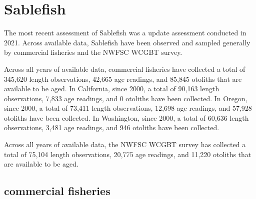 \documentclass[11pt,
  english,
  letterpaper,
]{article}
\begin{document}

\hypertarget{sablefish}{%
\section{Sablefish}\label{sablefish}}

\leavevmode\tagmcend\tagstructend


The most recent assessment of Sablefish was a update assessment conducted in 2021. Across available data, Sablefish have been observed and sampled generally by commercial fisheries and the NWFSC WCGBT survey.

\leavevmode\tagmcend\tagstructend\par


Across all years of available data, commercial fisheries have collected a total of 345,620 length observations, 42,665 age readings, and 85,845 otoliths that are available to be aged. In California, since 2000, a total of 90,163 length observations, 7,833 age readings, and 0 otoliths have been collected. In Oregon, since 2000, a total of 73,411 length observations, 12,698 age readings, and 57,928 otoliths have been collected. In Washington, since 2000, a total of 60,636 length observations, 3,481 age readings, and 946 otoliths have been collected.

\leavevmode\tagmcend\tagstructend\par


Across all years of available data, the NWFSC WCGBT survey has collected a total of 75,104 length observations, 20,775 age readings, and 11,220 otoliths that are available to be aged.

\leavevmode\tagmcend\tagstructend\par


\hypertarget{commercial-fisheries-44}{%
\subsection{commercial fisheries}\label{commercial-fisheries-44}}

\leavevmode\tagmcend\tagstructend

\end{document}
